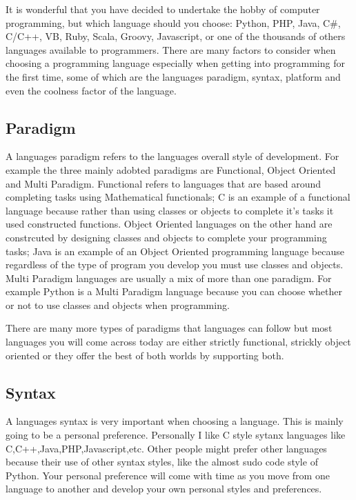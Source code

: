 It is wonderful that you have decided to undertake the hobby of computer programming, but which language should you choose: Python, PHP, Java, C\#,
C/C++, VB, Ruby, Scala, Groovy, Javascript, or one of the thousands of others languages available to programmers.
There are many factors to consider when choosing a programming language especially when getting into programming for the first time, some
of which are the languages paradigm, syntax, platform and even the coolness factor of the language.

\subsection{Paradigm}
A languages paradigm refers to the languages overall style of development.
For example the three mainly adobted paradigms are Functional, Object Oriented and Multi Paradigm.
Functional refers to languages that are based around completing tasks using Mathematical functionals; C is an example of
a functional language because rather than using classes or objects to complete it's tasks it used constructed functions.
Object Oriented languages on the other hand are constrcuted by designing classes and objects to complete your programming tasks;
Java is an example of an Object Oriented programming language because regardless of the type of program you develop you must use classes and objects.
Multi Paradigm languages are usually a mix of more than one paradigm.
For example Python is a Multi Paradigm language because you can choose whether or not to use classes and objects when programming.
\par

There are many more types of paradigms that languages can follow but most languages you will come across today are either
strictly functional, strickly object oriented or they offer the best of both worlds by supporting both.

\subsection{Syntax}
A languages syntax is very important when choosing a language.
This is mainly going to be a personal preference.
Personally I like C style sytanx languages like C,C++,Java,PHP,Javascript,etc.
Other people might prefer other languages because their use of other syntax styles, like the almost sudo code style of Python.
Your personal preference will come with time as you move from one language to another and develop your own personal styles and preferences.

